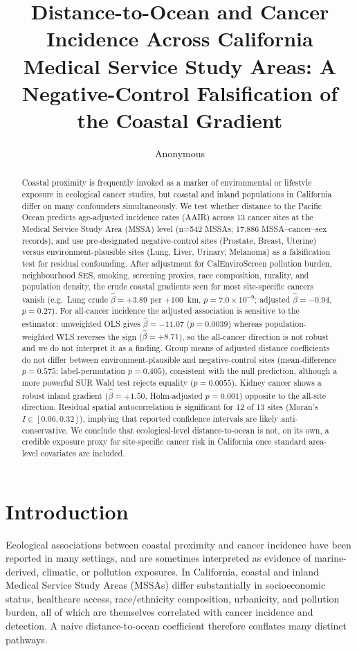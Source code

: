 \documentclass[11pt]{article}
\title{Distance-to-Ocean and Cancer Incidence Across California Medical Service Study Areas: A Negative-Control Falsification of the Coastal Gradient}
\author{Anonymous}
\date{}
\begin{document}
\maketitle

\begin{abstract}
Coastal proximity is frequently invoked as a marker of environmental or lifestyle exposure in ecological cancer studies, but coastal and inland populations in California differ on many confounders simultaneously. We test whether distance to the Pacific Ocean predicts age-adjusted incidence rates (AAIR) across 13 cancer sites at the Medical Service Study Area (MSSA) level (n=542 MSSAs; 17{,}886 MSSA--cancer--sex records), and use pre-designated negative-control sites (Prostate, Breast, Uterine) versus environment-plausible sites (Lung, Liver, Urinary, Melanoma) as a falsification test for residual confounding. After adjustment for CalEnviroScreen pollution burden, neighbourhood SES, smoking, screening proxies, race composition, rurality, and population density, the crude coastal gradients seen for most site-specific cancers vanish (e.g.\ Lung crude $\hat\beta=+3.89$ per $+100$~km, $p=7.0\times10^{-9}$; adjusted $\hat\beta=-0.94$, $p=0.27$). For all-cancer incidence the adjusted association is sensitive to the estimator: unweighted OLS gives $\hat\beta=-11.07$ ($p=0.0039$) whereas population-weighted WLS reverses the sign ($\hat\beta=+8.71$), so the all-cancer direction is not robust and we do not interpret it as a finding. Group means of adjusted distance coefficients do not differ between environment-plausible and negative-control sites (mean-difference $p=0.575$; label-permutation $p=0.405$), consistent with the null prediction, although a more powerful SUR Wald test rejects equality ($p=0.0055$). Kidney cancer shows a robust inland gradient ($\hat\beta=+1.50$, Holm-adjusted $p=0.001$) opposite to the all-site direction. Residual spatial autocorrelation is significant for 12 of 13 sites (Moran's $I\in[0.06,0.32]$), implying that reported confidence intervals are likely anti-conservative. We conclude that ecological-level distance-to-ocean is not, on its own, a credible exposure proxy for site-specific cancer risk in California once standard area-level covariates are included.
\end{abstract}

\section{Introduction}
Ecological associations between coastal proximity and cancer incidence have been reported in many settings, and are sometimes interpreted as evidence of marine-derived, climatic, or pollution exposures. In California, coastal and inland Medical Service Study Areas (MSSAs) differ substantially in socioeconomic status, healthcare access, race/ethnicity composition, urbanicity, and pollution burden, all of which are themselves correlated with cancer incidence and detection. A naive distance-to-ocean coefficient therefore conflates many distinct pathways.
\end{document}
